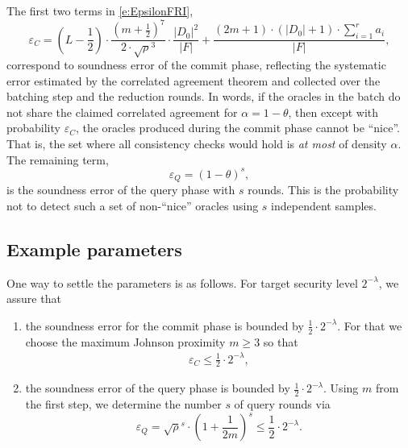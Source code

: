 \documentclass[11pt]{article}
\theoremstyle{definition}
\theoremstyle{remark}
\begin{document}

The first two terms in \eqref{e:EpsilonFRI},
\[
\varepsilon_C= \left(L-\frac{1}{2}\right) \cdot \frac {\left(m+ \frac{1}{2}\right)^7}{2\cdot\sqrt\rho^3}\cdot \frac{|D_0|^2}{|F|} 
+ \frac{(2m+1)\cdot (|D_0|+1)\cdot \sum_{i=1}^{r} a_i}{|F|},
\] 
correspond to soundness error of the commit phase, reflecting the systematic error estimated by the correlated agreement theorem and collected over the batching step and the reduction rounds.
In words, 
if the oracles in the batch do not share the claimed correlated agreement for $\alpha = 1-\theta$, then except with probability $\varepsilon_C$,  the oracles produced during the commit phase cannot be ``nice''. 
That is, the set where all consistency checks would hold is \textit{at most} of density $\alpha$.
The remaining term, 
\[
\varepsilon_Q = (1-\theta)^s,
\]
is the soundness error of the query phase with $s$ rounds.
This is the probability not to detect such a set of non-``nice'' oracles using $s$ independent samples. %







\subsection{Example parameters}

One way to settle the parameters is as follows. 
For target security level $2^{-\lambda}$, we assure that 
\begin{enumerate}
\item
the soundness error for the commit phase is bounded by  $\frac{1}{2}\cdot 2^{-\lambda}$. 
For that we choose the maximum Johnson proximity $m\geq 3$ so that 
\[
\begin{aligned}
\varepsilon_C \leq \frac{1}{2}\cdot 2^{-\lambda},
\end{aligned}
\]
\item
the soundness error of the query phase is bounded by $\frac{1}{2}\cdot 2^{-\lambda}$. 
Using $m$ from the first step, we determine the number $s$ of query rounds via
\[
\varepsilon_Q = \sqrt\rho^s \cdot \left(1 + \frac{1}{2m}\right)^s \leq \frac{1}{2}\cdot 2^{-\lambda}.
\]
\end{enumerate}
\end{document}
